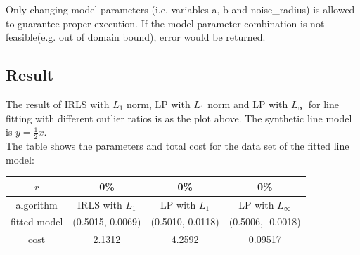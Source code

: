 \documentclass[paper=a4, fontsize=11pt]{scrartcl} %
\numberwithin{equation}{section} %
\numberwithin{figure}{section} %
\numberwithin{table}{section} %
\begin{document}
Only changing model parameters (i.e. variables a, b and noise\_radius) is allowed to guarantee proper execution. If the model parameter combination is not feasible(e.g. out of domain bound), error would be returned. \\

\subsection{Result}

\noindent{}

The result of IRLS with $L_{1}$ norm, LP with $L_{1}$ norm and LP with $L_{\infty}$ for line fitting with different outlier ratios is as the plot above. The synthetic line model is $y = \frac{1}{2}x$.\\

The table shows the parameters and total cost for the data set of the fitted line model:

\begin{center}
    \begin{tabular}{ | c | c | c | c |}
    \hline
    $r$			&	0\%				&	0\%				&	0\%				 \\ \hline
    algorithm		&	IRLS	 with $L_{1}$	&	LP	 with $L_{1}$	&	LP with $L_{\infty}$		\\ \hline	
    fitted model		&	(0.5015, 0.0069) 	& 	(0.5010, 0.0118) 	& 	 (0.5006, -0.0018)	\\ \hline
    cost 			& 	2.1312			& 	4.2592 			& 	0.09517			 \\ \hline
    \end{tabular}
\end{center} 
\end{document}
